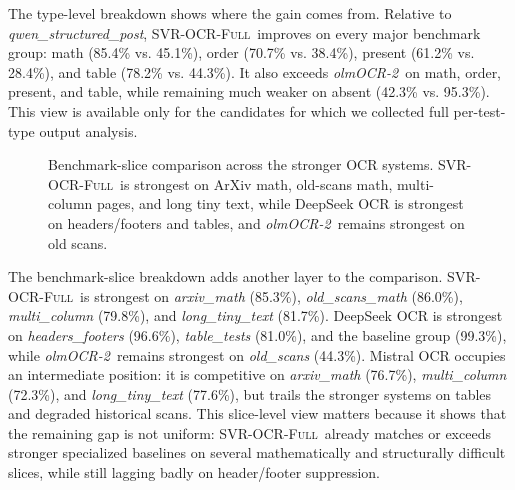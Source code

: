 \documentclass[conference]{IEEEtran}
\newcommand{\papername}[1]{\textit{#1}}
\newcommand{\svrocr}{\textsc{SVR-OCR-Full}}
\newcommand{\olmocr}{\papername{olmOCR-2}}
\begin{document}
The type-level breakdown shows where the gain comes from. Relative to \papername{qwen\_structured\_post}, \svrocr\ improves on every major benchmark group: math (85.4\% vs. 45.1\%), order (70.7\% vs. 38.4\%), present (61.2\% vs. 28.4\%), and table (78.2\% vs. 44.3\%). It also exceeds \olmocr\ on math, order, present, and table, while remaining much weaker on absent (42.3\% vs. 95.3\%). This view is available only for the candidates for which we collected full per-test-type output analysis.

\begin{figure}[t]
\centering

\caption{Benchmark-slice comparison across the stronger OCR systems. \svrocr\ is strongest on ArXiv math, old-scans math, multi-column pages, and long tiny text, while DeepSeek OCR is strongest on headers/footers and tables, and \olmocr\ remains strongest on old scans.}
\label{fig:backend-slices}
\end{figure}

The benchmark-slice breakdown adds another layer to the comparison. \svrocr\ is strongest on \papername{arxiv\_math} (85.3\%), \papername{old\_scans\_math} (86.0\%), \papername{multi\_column} (79.8\%), and \papername{long\_tiny\_text} (81.7\%). DeepSeek OCR is strongest on \papername{headers\_footers} (96.6\%), \papername{table\_tests} (81.0\%), and the baseline group (99.3\%), while \olmocr\ remains strongest on \papername{old\_scans} (44.3\%). Mistral OCR occupies an intermediate position: it is competitive on \papername{arxiv\_math} (76.7\%), \papername{multi\_column} (72.3\%), and \papername{long\_tiny\_text} (77.6\%), but trails the stronger systems on tables and degraded historical scans. This slice-level view matters because it shows that the remaining gap is not uniform: \svrocr\ already matches or exceeds stronger specialized baselines on several mathematically and structurally difficult slices, while still lagging badly on header/footer suppression.
\end{document}
